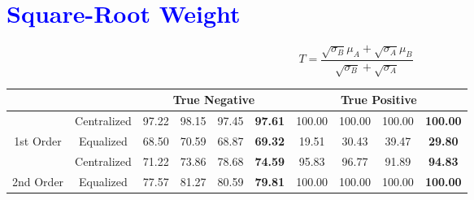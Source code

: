 \documentclass[10pt,a4paper]{article}
\begin{document}
	\section{\textcolor{blue}{Square-Root Weight}}
		$$T = \frac{\sqrt{\sigma_B} \mu_A + \sqrt{\sigma_A} \mu_B}{\sqrt{\sigma_B} + \sqrt{\sigma_A}}$$
		\begin{table}[!h]
			\centering
			\begin{tabular}{|c|c|c|c|c|c|c|c|c|c|}
				\hline
				&             & \multicolumn{4}{c|}{True Negative}                            & \multicolumn{4}{c|}{True Positive}                                \\ \hline
				& Centralized & 97.22 & 98.15 & 97.45 & {\color[HTML]{FE0000} \textbf{97.61}} & 100.00 & 100.00 & 100.00 & {\color[HTML]{FE0000} \textbf{100.00}} \\ \cline{2-10} 
				\multirow{-2}{*}{1st Order} & Equalized   & 68.50 & 70.59 & 68.87 & {\color[HTML]{FE0000} \textbf{69.32}} & 19.51  & 30.43  & 39.47  & {\color[HTML]{FE0000} \textbf{29.80}}  \\ \hline
				& Centralized & 71.22 & 73.86 & 78.68 & {\color[HTML]{FE0000} \textbf{74.59}} & 95.83  & 96.77  & 91.89  & {\color[HTML]{FE0000} \textbf{94.83}}  \\ \cline{2-10} 
				\multirow{-2}{*}{2nd Order} & Equalized   & 77.57 & 81.27 & 80.59 & {\color[HTML]{FE0000} \textbf{79.81}} & 100.00 & 100.00 & 100.00 & {\color[HTML]{FE0000} \textbf{100.00}} \\ \hline
			\end{tabular}
		\end{table}
	
\end{document}

